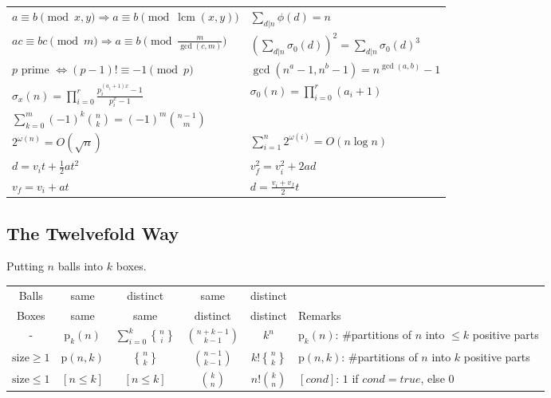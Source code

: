 \documentclass[a4paper, 8pt, landscape, oneside]{extarticle}
\DeclareMathOperator{\lcm}{lcm}
\DeclareRobustCommand{\stirling}{\genfrac\{\}{0pt}{}}
\begin{document}
\begin{multicols*}{3}
\begin{tabular}{ll}
                $a\equiv b\pmod{x,y} \Rightarrow a\equiv b\pmod{\lcm(x,y)}$ & $\sum_{d|n} \phi(d) = n$ \\
                $ac\equiv bc\pmod{m} \Rightarrow a\equiv b\pmod{\frac{m}{\gcd(c,m)}}$ & $(\sum_{d|n} \sigma_0(d))^2 = \sum_{d|n} \sigma_0(d)^3$ \\
                $p$ prime $\Leftrightarrow (p-1)!\equiv -1\pmod{p}$ & $\gcd(n^a-1,n^b-1) = n^{\gcd(a,b)}-1$ \\
                $\sigma_x(n) = \prod_{i=0}^{r} \frac{p_i^{(a_i + 1)x} - 1}{p_i^x - 1}$ & $\sigma_0(n) = \prod_{i=0}^r (a_i + 1)$ \\
                $\sum_{k=0}^m (-1)^k \binom{n}{k} = (-1)^m \binom{n-1}{m}$ & \\
                $2^{\omega(n)} = O(\sqrt{n})$ & $\sum_{i=1}^n 2^{\omega(i)} = O(n \log n)$ \\
                $d = v_i t + \frac{1}{2}at^2$ & $v_f^2 = v_i^2 + 2ad$ \\
                $v_f = v_i + at$ & $d = \frac{v_i + v_f}{2}t$ \\
            \end{tabular}
            \subsection{The Twelvefold Way}
                Putting $n$ balls into $k$ boxes.\\
            \begin{tabular}{@{}c|c|c|c|c|l@{}}
            Balls & same & distinct & same & distinct & \\
            Boxes & same & same & distinct & distinct & Remarks\\
            \hline
                - & $\mathrm{p}_k(n)$ & $\sum_{i=0}^k \stirling{n}{i}$ & $\binom{n+k-1}{k-1}$ & $k^n$ & $\mathrm{p}_k(n)$: \#partitions of $n$ into $\le k$ positive parts \\
                $\mathrm{size}\ge 1$ & $\mathrm{p}(n,k)$ & $\stirling{n}{k}$ & $\binom{n-1}{k-1}$ & $k!\stirling{n}{k}$ & $\mathrm{p}(n,k)$: \#partitions of $n$ into $k$ positive parts \\
                $\mathrm{size}\le 1$ & $[n \le k]$ & $[n \le k]$ & $\binom{k}{n}$ & $n!\binom{k}{n}$ & $[cond]$: $1$ if $cond=true$, else $0$\\
            \bottomrule
            \end{tabular}
\end{multicols*}
\end{document}
